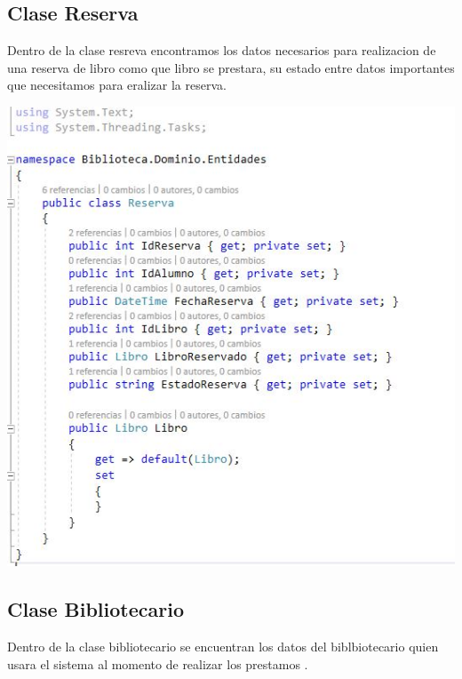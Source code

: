  \subsection{Clase Reserva}
 Dentro de la clase resreva encontramos los datos necesarios para realizacion de una reserva de libro como que libro se prestara, su estado entre datos importantes que necesitamos para eralizar la reserva.
 	\begin{center}
	\includegraphics[width=14cm]{./Imagenes/img13reserva} 
	\end{center}
	
 \newpage
 \subsection{Clase Bibliotecario}
 Dentro de la clase  bibliotecario se encuentran los datos del biblbiotecario quien usara el sistema al momento de realizar los prestamos .
 	

